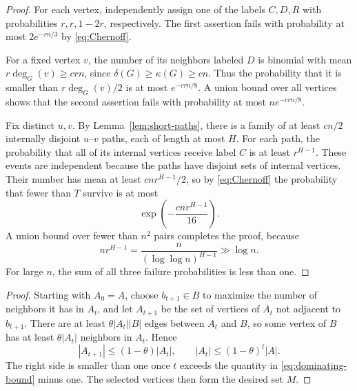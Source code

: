 \documentclass{article}
\newtheorem{lem}[thm]{Lemma}
\begin{document}
\begin{proof}
For each vertex, independently assign one of the labels $C,D,R$ with probabilities $r,r,1-2r$, respectively.  The first assertion fails with probability at most $2e^{-rn/3}$ by \eqref{eq:Chernoff}.

For a fixed vertex $v$, the number of its neighbors labeled $D$ is binomial with mean $r\deg_G(v)\ge crn$, since $\delta(G)\ge\kappa(G)\ge cn$.  Thus the probability that it is smaller than $r\deg_G(v)/2$ is at most $e^{-crn/8}$.  A union bound over all vertices shows that the second assertion fails with probability at most $ne^{-crn/8}$.

Fix distinct $u,v$.  By Lemma~\ref{lem:short-paths}, there is a family of at least $cn/2$ internally disjoint $u$--$v$ paths, each of length at most $H$.  For each path, the probability that all of its internal vertices receive label $C$ is at least $r^{H-1}$.  These events are independent because the paths have disjoint sets of internal vertices.  Their number has mean at least $cnr^{H-1}/2$, so by \eqref{eq:Chernoff} the probability that fewer than $T$ survive is at most
\[
 \exp\left(-\frac{cnr^{H-1}}{16}\right).
\]
A union bound over fewer than $n^2$ pairs completes the proof, because
\[
 nr^{H-1}=\frac{n}{(\log\log n)^{H-1}}\gg\log n.
\]
For large $n$, the sum of all three failure probabilities is less than one.
\end{proof}


\begin{proof}
Starting with $A_0=A$, choose $b_{t+1}\in B$ to maximize the number of neighbors it has in $A_t$, and let $A_{t+1}$ be the set of vertices of $A_t$ not adjacent to $b_{t+1}$.  There are at least $\theta|A_t||B|$ edges between $A_t$ and $B$, so some vertex of $B$ has at least $\theta|A_t|$ neighbors in $A_t$.  Hence
\[
 |A_{t+1}|\le(1-\theta)|A_t|,
 \qquad
 |A_t|\le(1-\theta)^t|A|.
\]
The right side is smaller than one once $t$ exceeds the quantity in \eqref{eq:dominating-bound} minus one.  The selected vertices then form the desired set $M$.
\end{proof}
\end{document}
